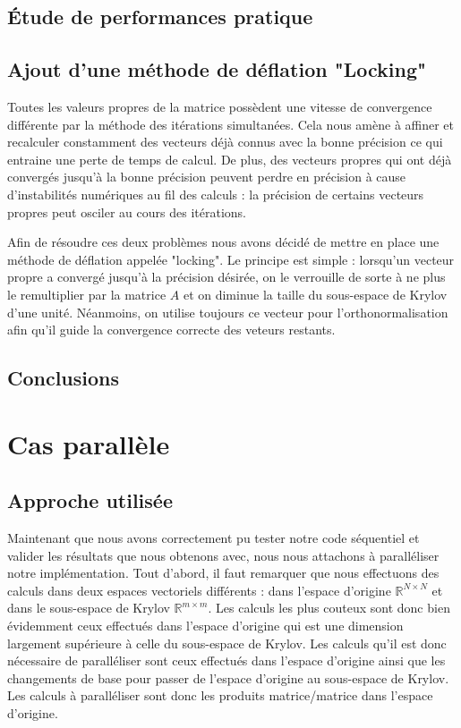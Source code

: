 \documentclass[11pt,a4paper]{article}
\begin{document}
	\subsection{Étude de performances pratique}



	\subsection{Ajout d'une méthode de déflation "Locking"}
		Toutes les valeurs propres de la matrice possèdent une vitesse de convergence différente par la méthode des itérations simultanées. Cela nous amène à affiner et recalculer constamment des vecteurs déjà connus avec la bonne précision ce qui entraine une perte de temps de calcul. De plus, des vecteurs propres qui ont déjà convergés jusqu'à la bonne précision peuvent perdre en précision à cause d'instabilités numériques au fil des calculs : la précision de certains vecteurs propres peut osciler au cours des itérations.

		Afin de résoudre ces deux problèmes nous avons décidé de mettre en place une méthode de déflation appelée "locking". Le principe est simple : lorsqu'un vecteur propre a convergé jusqu'à la précision désirée, on le verrouille de sorte à ne plus le remultiplier par la matrice $A$ et on diminue la taille du sous-espace de Krylov d'une unité. Néanmoins, on utilise toujours ce vecteur pour l'orthonormalisation afin qu'il guide la convergence correcte des veteurs restants.

	\subsection{Conclusions}

\section{Cas parallèle}
	\subsection{Approche utilisée}
		Maintenant que nous avons correctement pu tester notre code séquentiel et valider les résultats que nous obtenons avec, nous nous attachons à paralléliser notre implémentation. Tout d'abord, il faut remarquer que nous effectuons des calculs dans deux espaces vectoriels différents : dans l'espace d'origine $\mathbb{R}^{N\times N}$ et dans le sous-espace de Krylov $\mathbb{R}^{m\times m}$. Les calculs les plus couteux sont donc bien évidemment ceux effectués dans l'espace d'origine qui est une dimension largement supérieure à celle du sous-espace de Krylov. Les calculs qu'il est donc nécessaire de paralléliser sont ceux effectués dans l'espace d'origine ainsi que les changements de base pour passer de l'espace d'origine au sous-espace de Krylov. Les calculs à paralléliser sont donc les produits matrice/matrice dans l'espace d'origine.
\end{document}
